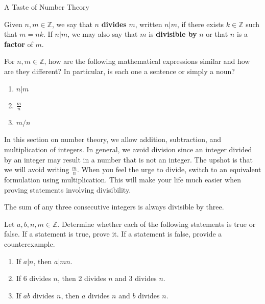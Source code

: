 \begin{section}{A Taste of Number Theory}
\begin{definition}\label{def:divides}
Given $n,m\in\mathbb{Z}$, we say that $n$ \textbf{divides} $m$, written $\boxed{n|m}$, if there exists $k\in\mathbb{Z}$ such that $m=nk$. If $n|m$, we may also say that $m$ is \textbf{divisible by} $n$ or that $n$ is a \textbf{factor} of $m$.
\end{definition}

\begin{problem}
For $n,m\in\mathbb{Z}$, how are the following mathematical expressions similar and how are they different? In particular, is each one a sentence or simply a noun?
\begin{enumerate}[label=\textrm{(\alph*)}]
\item $n|m$
\item $\displaystyle \frac{m}{n}$
\item $m/n$
\end{enumerate}
\end{problem}

In this section on number theory, we allow addition, subtraction, and multiplication of integers.  In general, we avoid division since an integer divided by an integer may result in a number that is not an integer. The upshot is that we will avoid writing $\frac{m}{n}$.  When you feel the urge to divide, switch to an equivalent formulation using multiplication. This will make your life much easier when proving statements involving divisibility.

\begin{theorem}\label{thm:sum of three consecutive integers}
The sum of any three consecutive integers is always divisible by three.
\end{theorem}

\begin{problem}\label{prob:divisibility examples}
Let $a, b,n, m\in\mathbb{Z}$. Determine whether each of the following statements is true or false.  If a statement is true, prove it. If a statement is false, provide a counterexample.
\begin{enumerate}[label=\textrm{(\alph*)}]
\item\label{prob:first divisibility example} If $a|n$, then $a|mn$.
\item If 6 divides $n$, then 2 divides $n$ and 3 divides $n$.
\item If $ab$ divides $n$, then $a$ divides $n$ and $b$ divides $n$.
\end{enumerate}
\end{problem}


\end{section}
